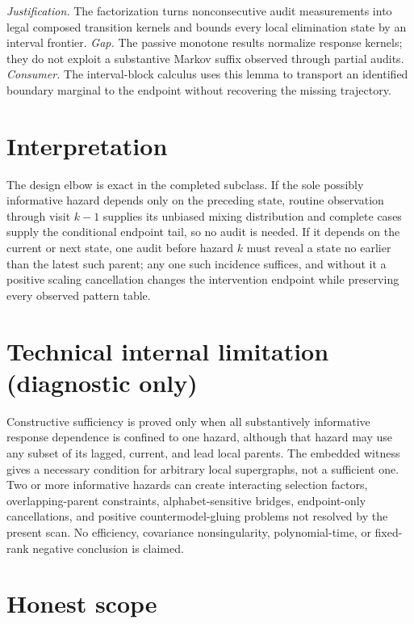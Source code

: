 \documentclass{article}
\begin{document}
\par\smallskip\noindent \textit{Justification.} The factorization turns nonconsecutive audit measurements into legal composed transition kernels and bounds every local elimination state by an interval frontier. \textit{Gap.} The passive monotone results normalize response kernels; they do not exploit a substantive Markov suffix observed through partial audits. \textit{Consumer.} The interval-block calculus uses this lemma to transport an identified boundary marginal to the endpoint without recovering the missing trajectory.

\section{Interpretation}

The design elbow is exact in the completed subclass. If the sole possibly informative hazard depends only on the preceding state, routine observation through visit \(k-1\) supplies its unbiased mixing distribution and complete cases supply the conditional endpoint tail, so no audit is needed. If it depends on the current or next state, one audit before hazard \(k\) must reveal a state no earlier than the latest such parent; any one such incidence suffices, and without it a positive scaling cancellation changes the intervention endpoint while preserving every observed pattern table.

\section*{Technical internal limitation (diagnostic only)}

Constructive sufficiency is proved only when all substantively informative response dependence is confined to one hazard, although that hazard may use any subset of its lagged, current, and lead local parents. The embedded witness gives a necessary condition for arbitrary local supergraphs, not a sufficient one. Two or more informative hazards can create interacting selection factors, overlapping-parent constraints, alphabet-sensitive bridges, endpoint-only cancellations, and positive countermodel-gluing problems not resolved by the present scan. No efficiency, covariance nonsingularity, polynomial-time, or fixed-rank negative conclusion is claimed.

\section{Honest scope}
\end{document}
